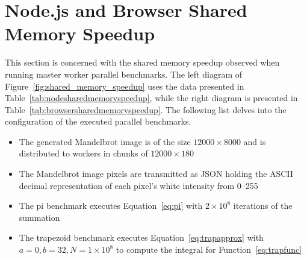 \documentclass[oneside]{um-fict}
\begin{document}
\section{Node.js and Browser Shared Memory Speedup}
This section is concerned with the shared memory speedup observed when running master worker parallel benchmarks. The left diagram of Figure~\ref{fig:shared_memory_speedup} uses the data presented in Table~\ref{tab:nodesharedmemoryspeedup}, while the right diagram is presented in Table~\ref{tab:browsersharedmemoryspeedup}. The following list delves into the configuration of the executed parallel benchmarks.
\begin{itemize}
\item The generated Mandelbrot image is of the size $12000 \times 8000$ and is distributed to workers in chunks of $12000 \times 180$
\item The Mandelbrot image pixels are transmitted as JSON holding the ASCII decimal representation of each pixel's white intensity from 0--255
\item The pi benchmark executes Equation~\ref{eq:pi} with $2 \times 10^8$ iterations of the summation
\item The trapezoid benchmark executes Equation~\ref{eq:trapapprox} with $a = 0, b = 32, N = 1 \times 10^8$ to compute the integral for Function~\ref{eq:trapfunc}
\end{itemize}
\end{document}
